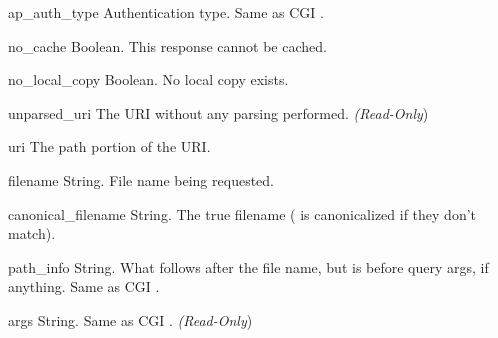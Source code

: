 \begin{memberdesc}[request]{ap_auth_type}
  Authentication type. Same as CGI .
\end{memberdesc}

\begin{memberdesc}[request]{no_cache}
  Boolean. This response cannot be cached.
\end{memberdesc}

\begin{memberdesc}[request]{no_local_copy}
  Boolean. No local copy exists.
\end{memberdesc}

\begin{memberdesc}[request]{unparsed_uri}
  The URI without any parsing performed.
  \emph{(Read-Only})
\end{memberdesc}

\begin{memberdesc}[request]{uri}
  The path portion of the URI.
\end{memberdesc}

\begin{memberdesc}[request]{filename}
  String. File name being requested.
\end{memberdesc}

\begin{memberdesc}[request]{canonical_filename}
  String. The true filename ( is canonicalized if
  they don't match).
\end{memberdesc}

\begin{memberdesc}[request]{path_info}
  String. What follows after the file name, but is before query args, if
  anything. Same as CGI .
\end{memberdesc}

\begin{memberdesc}[request]{args}
  String. Same as CGI .
  \emph{(Read-Only})
\end{memberdesc}

